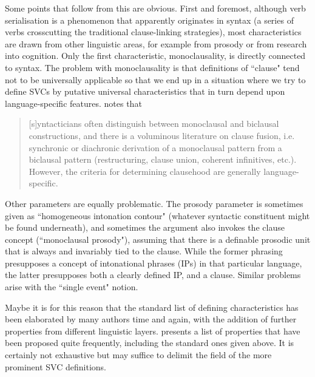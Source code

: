 Some points that follow from this are obvious. First and foremost, although verb serialisation is a phenomenon that apparently originates in syntax (a series of verbs crosscutting the traditional clause-linking strategies), most characteristics are drawn from other linguistic areas, for example from prosody or from research into cognition. Only the first characteristic, monoclausality, is directly connected to syntax. The problem with monoclausality is that definitions of ``clause" tend not to be universally applicable so that we end up in a situation where we try to define SVCs by putative universal characteristics that in turn depend upon language-specific features. \citet[298]{haspelmath2016serial} notes that \begin{quote}[s]yntacticians often distinguish between monoclausal and biclausal constructions, and there is a voluminous literature on clause fusion, i.e. synchronic or diachronic derivation of a monoclausal pattern from a biclausal pattern
(restructuring, clause union, coherent infinitives, etc.). However, the criteria for determining clausehood are generally language-specific.\end{quote}

Other parameters are equally problematic. The prosody parameter is sometimes given as ``homogeneous intonation contour" (whatever syntactic constituent might be found underneath), and sometimes the argument also invokes the clause concept (``monoclausal prosody"), assuming that there is a definable prosodic unit that is always and invariably tied to the clause. While the former phrasing presupposes a concept of intonational phrases (IPs) in that particular language, the latter presupposes both a clearly defined IP, and a clause. Similar problems arise with the ``single event" notion.

Maybe it is for this reason that the standard list of defining characteristics has been elaborated by many authors time and again, with the addition of further properties from different linguistic layers.  presents a list of properties that have been proposed quite frequently, including the standard ones given above. It is certainly not exhaustive but may suffice to delimit the field of the more prominent SVC definitions.

